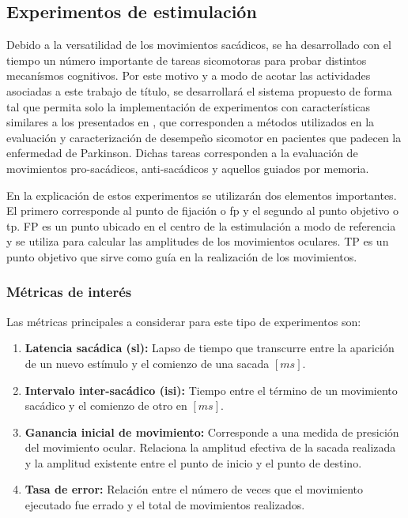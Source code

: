 \documentclass[../main.tex]{subfiles}
\begin{document}
		\vspace{-10mm}
		\subsection{Experimentos de estimulación}
		\label{sub:02_experimentos_de_estimulacion}
			Debido a la versatilidad de los movimientos sacádicos, se ha desarrollado con el tiempo un número importante de tareas sicomotoras para probar distintos mecanísmos cognitivos. Por este motivo y a modo de acotar las actividades asociadas a este trabajo de título, se desarrollará el sistema propuesto de forma tal que permita solo la implementación de experimentos con características similares a los presentados en \cite{article:tests_1, article:tests_2, article:tests_3, article:tests_4, article:tests_5}, que corresponden a métodos utilizados en la evaluación y caracterización de desempeño sicomotor en pacientes que padecen la enfermedad de Parkinson. Dichas tareas corresponden a la evaluación de movimientos pro-sacádicos, anti-sacádicos y aquellos guiados por memoria.

			En la explicación de estos experimentos se utilizarán dos elementos importantes. El primero corresponde al punto de fijación o \acrshort{fp} y el segundo al punto objetivo o \acrshort{tp}. FP es un punto ubicado en el centro de la estimulación a modo de referencia y se utiliza para calcular las amplitudes de los movimientos oculares. TP es un punto objetivo que sirve como guía en la realización de los movimientos. 

			\vspace{-5mm}
			\subsubsection{Métricas de interés}
			\label{ssub:metricas_de_interes}
				Las métricas principales a considerar para este tipo de experimentos son:
				\begin{enumerate}\setlength\itemsep{-0.5em}
				 	\item \textbf{Latencia sacádica (\acrshort{sl}):} Lapso de tiempo que transcurre entre la aparición de un nuevo estímulo y el comienzo de una sacada $[ms]$. 

				 	\item \textbf{Intervalo inter-sacádico (\acrshort{isi}):} Tiempo entre el término de un movimiento sacádico y el comienzo de otro en $[ms]$.
				 	
				 	\item \textbf{Ganancia inicial de movimiento:} Corresponde  a una medida de presición del movimiento ocular. Relaciona la amplitud efectiva de la sacada realizada y la amplitud existente entre el punto de inicio y el punto de destino.   
				 	
				 	\item \textbf{Tasa de error:} Relación entre el número de veces que el movimiento ejecutado fue errado y el total de movimientos realizados. 

				 \end{enumerate} 
\end{document}
